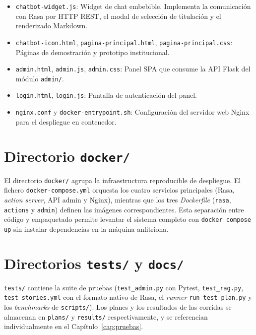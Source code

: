 \begin{itemize}
    \item \texttt{chatbot-widget.js}: Widget de chat embebible. Implementa la comunicación con Rasa por HTTP REST, el modal de selección de titulación y el renderizado Markdown.
    \item \texttt{chatbot-icon.html}, \texttt{pagina-principal.html}, \texttt{pagina-principal.css}: Páginas de demostración y prototipo institucional.
    \item \texttt{admin.html}, \texttt{admin.js}, \texttt{admin.css}: Panel SPA que consume la API Flask del módulo \texttt{admin/}.
    \item \texttt{login.html}, \texttt{login.js}: Pantalla de autenticación del panel.
    \item \texttt{nginx.conf} y \texttt{docker-entrypoint.sh}: Configuración del servidor web Nginx para el despliegue en contenedor.
\end{itemize}

\section{Directorio \texttt{docker/}}\label{sec:docker}

El directorio \texttt{docker/} agrupa la infraestructura reproducible de despliegue. El fichero \texttt{docker-compose.yml} orquesta los cuatro servicios principales (Rasa, \textit{action server}, API admin y Nginx), mientras que los tres \textit{Dockerfile} (\texttt{rasa}, \texttt{actions} y \texttt{admin}) definen las imágenes correspondientes. Esta separación entre código y empaquetado permite levantar el sistema completo con \texttt{docker compose up} sin instalar dependencias en la máquina anfitriona.

\section{Directorios \texttt{tests/} y \texttt{docs/}}\label{sec:tests-docs}

\texttt{tests/} contiene la suite de pruebas (\texttt{test\_admin.py} con Pytest, \texttt{test\_rag.py}, \texttt{test\_stories.yml} con el formato nativo de Rasa, el \textit{runner} \texttt{run\_test\_plan.py} y los \textit{benchmarks} de \texttt{scripts/}). Los planes y los resultados de las corridas se almacenan en \texttt{plans/} y \texttt{results/} respectivamente, y se referencian individualmente en el Capítulo~\ref{cap:pruebas}.

